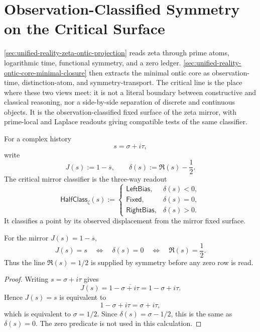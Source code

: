 \section{Observation-Classified Symmetry on the Critical Surface}
\label{sec:unified-reality-observation-classified-symmetry}

\autoref{sec:unified-reality-zeta-ontic-projection} reads zeta through
prime atoms, logarithmic time, functional symmetry, and a zero ledger.
\autoref{sec:unified-reality-ontic-core-minimal-closure} then extracts the
minimal ontic core as observation-time, distinction-atom, and
symmetry-transport.  The critical line is the place where these two views
meet: it is not a literal boundary between constructive and classical
reasoning, nor a side-by-side separation of discrete and continuous objects.
It is the observation-classified fixed surface of the zeta mirror, with
prime-local and Laplace readouts giving compatible tests of the same
classifier.

\begin{definition}
\label{def:unified-reality-critical-mirror-classifier}
For a complex history
$$
s=\sigma+i\tau,
$$
write
$$
J(s):=1-\overline{s},
\qquad
\delta(s):=\Re(s)-\frac12.
$$
The critical mirror classifier is the three-way readout
$$
\mathsf{HalfClass}_{\zeta}(s)
:=
\begin{cases}
\mathsf{LeftBias}, & \delta(s)<0,\\
\mathsf{Fixed}, & \delta(s)=0,\\
\mathsf{RightBias}, & \delta(s)>0.
\end{cases}
$$
It classifies a point by its observed displacement from the mirror fixed
surface.
\end{definition}

\begin{theorem}
\label{thm:unified-reality-critical-line-mirror-fixed-surface}
For the mirror $J(s)=1-\overline{s}$,
$$
J(s)=s
\quad\Longleftrightarrow\quad
\delta(s)=0
\quad\Longleftrightarrow\quad
\Re(s)=\frac12.
$$
Thus the line $\Re(s)=1/2$ is supplied by symmetry before any zero row is
read.
\end{theorem}

\begin{proof}
Writing $s=\sigma+i\tau$ gives
$$
J(s)=1-\overline{\sigma+i\tau}
=1-\sigma+i\tau.
$$
Hence $J(s)=s$ is equivalent to
$$
1-\sigma+i\tau=\sigma+i\tau,
$$
which is equivalent to $\sigma=1/2$.  Since
$\delta(s)=\sigma-1/2$, this is the same as $\delta(s)=0$.  The zero
predicate is not used in this calculation.
\end{proof}

